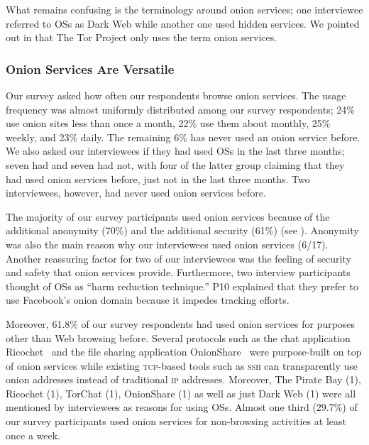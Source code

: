 What remains confusing is the terminology around onion services; one interviewee
referred to OSs as Dark Web while another one used hidden services.  We pointed
out in  that The Tor Project only uses the term onion
services.


\subsubsection{Onion Services Are Versatile}

Our survey asked how often our respondents browse onion services.  The usage
frequency was almost uniformly distributed among our survey respondents; 24\%
use onion sites less than once a month, 22\% use them about monthly, 25\%
weekly, and 23\% daily.  The remaining 6\% has never used an onion service
before.  We also asked our interviewees if they had used OSs in the last three
months; seven had and seven had not, with four of the latter group claiming that
they had used onion services before, just not in the last three months.  Two
interviewees, however, had never used onion services before.

The majority of our survey participants used onion services because of the
additional anonymity (70\%) and the additional security (61\%) (see
).  Anonymity was also the main reason why our
interviewees used onion services (6/17).  Another reassuring factor for two of
our interviewees was the feeling of security and safety that onion services
provide.  Furthermore, two interview participants thought of OSs as ``harm
reduction technique.''  P10 explained that they prefer to use Facebook's onion
domain because it impedes tracking efforts.

Moreover, 61.8\% of our survey respondents had used onion services for purposes
other than Web browsing before.  Several protocols such as the chat application
Ricochet~\cite{ricochet} and the file sharing application
OnionShare~\cite{onionshare} were purpose-built on top of onion services while
existing \textsc{tcp}-based tools such as \textsc{ssh} can transparently use
onion addresses instead of traditional \textsc{ip} addresses.  Moreover, The
Pirate Bay (1), Ricochet (1), TorChat (1), OnionShare (1) as well as just Dark
Web (1) were all mentioned by interviewees as reasons for using OSs.  Almost one
third (29.7\%) of our survey participants used onion services for non-browsing
activities at least once a week. 

